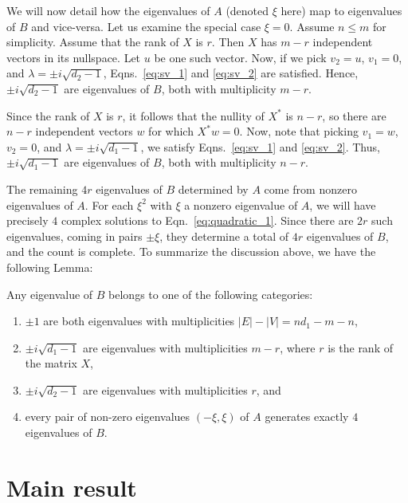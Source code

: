 
We will now detail how the eigenvalues of $A$ (denoted $\xi$ here) 
map to eigenvalues of $B$ and vice-versa.
Let us examine the special case $\xi = 0$. Assume $n \leq m$ for simplicity.
Assume that the rank of $X$ is $r$. 
Then $X$ has $m-r$ independent vectors in its nullspace. 
Let $u$ be one such vector. 
Now, if we pick $v_2 = u$, $v_1 = 0$, and $\lambda = \pm i \sqrt{d_2-1}$,
Eqns.~\eqref{eq:sv_1} and \eqref{eq:sv_2} are satisfied. 
Hence, $\pm i \sqrt{d_2-1}$ are eigenvalues of $B$, both with multiplicity $m-r$. 

Since the rank of $X$ is $r$, it follows that the nullity of $X^*$ is $n-r$, 
so there are $n-r$ independent vectors $w$ for which $X^*w = 0$. 
Now, note that picking $v_1 = w$, $v_2 = 0$, and $\lambda = \pm i \sqrt{d_1 -1}$, 
we satisfy Eqns.~\eqref{eq:sv_1} and \eqref{eq:sv_2}. 
Thus, $\pm i \sqrt{d_1-1}$ are eigenvalues of $B$, both with multiplicity $n-r$.

The remaining $4r$ eigenvalues of $B$ determined by $A$ come from nonzero
eigenvalues of $A$.
For each $\xi^2$ with $\xi$ a nonzero eigenvalue of $A$, 
we will have precisely $4$ complex solutions to Eqn.~\eqref{eq:quadratic_1}. 
Since there are $2r$ such eigenvalues, 
coming in pairs $\pm \xi$, they determine a total of $4r$ eigenvalues of $B$, 
and the count is complete.  
To summarize the discussion above, we have the following Lemma:
\begin{lemma} 
\label{A2B} 
Any eigenvalue of $B$ belongs to one of the following categories:
\begin{enumerate}
\item $\pm 1$ are both eigenvalues with multiplicities $|E|-|V| = nd_1 - m -n$,
\item $\pm i \sqrt{d_1-1}$ are eigenvalues with multiplicities $m-r$, where $r$ is the rank of the matrix $X$,
\item $\pm i \sqrt{d_2-1}$ are eigenvalues with multiplicities $r$, and
\item every pair of non-zero eigenvalues $(-\xi, \xi)$ of $A$ generates exactly $4$ eigenvalues of $B$. 
\end{enumerate}
\end{lemma}

\section{Main result}

